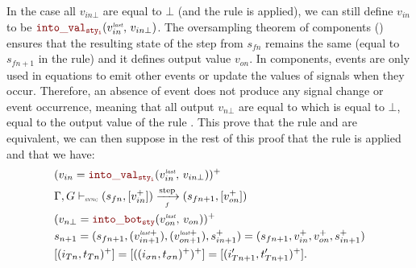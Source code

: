\begin{skippableproof}
\begin{itemize}
              In the case all $v_{in\bot}$ are equal to $\bot$ (and the rule
               is applied), we can
              still define $v_{in}$ to be $\intoVal{sty_i}{v_{in}^{\explast}}{v_{in\bot}}$.
              The oversampling theorem of components ()
              ensures that the resulting state of the step from $s_{fn}$ remains the same
              (\ie equal to $s_{fn+1}$ in the 
              rule) and it defines output value $v_{on}$. In components, events are only
              used in  equations to emit other events or update the values of
              signals when they occur. Therefore, an absence of event does not produce any
              signal change or event occurrence, meaning that all output $v_{n\bot}$ are
              equal to  which is equal to $\bot$,
              \ie equal to the output value of the rule
              .
              This prove that the rule 
              and  are equivalent,
              we can then suppose in the rest of this proof that the rule
               is applied and that
              we have:
              \begin{align*}
                   & (v_{in} = \intoVal{sty_i}{v_{in}^{\explast}}{v_{in\bot}})^+                                                                   \\
                   & \compOpsem{s_{fn}}{v_{in}^+}{f}{s_{fn+1}}{v_{on}^+}                                                                           \\
                   & (v_{n\bot} = \intoBot{sty}{v_{on}^{\explast}}{v_{on}})^+                                                                      \\
                   & s_{n+1} = (s_{fn+1}, (v_{in+1}^{\explast+}), (v_{on+1}^{\explast+}), s_{in+1}^+) = (s_{fn+1}, v_{in}^+, v_{on}^+, s_{in+1}^+) \\
                   & [(i_{Tn}, t_{Tn})^+] = [((i_{\sigma n}, t_{\sigma n})^+)^+] = [(i'_{Tn+1}, t'_{Tn+1})^+].
              \end{align*}


\end{itemize}
\end{skippableproof}
